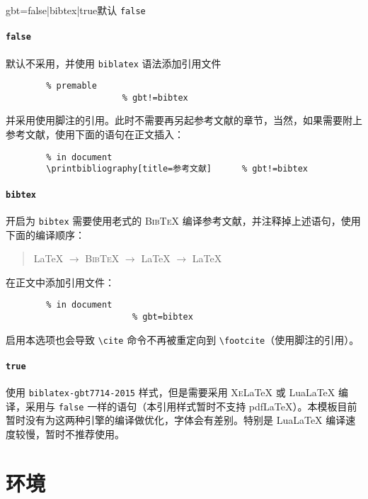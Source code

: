 \documentclass[a4paper,12pt]{article}
\begin{document}
\begin{CJK}{UTF8}{song}
\begin{docKey*}[SJTUBeamermin]{gbt}{=false|bibtex|true}{默认 \texttt{false}}
    \paragraph{\texttt{false}} 默认不采用，并使用 \verb"biblatex" 语法添加引用文件
    \begin{verbatim}
        % premable
                       % gbt!=bibtex
    \end{verbatim}
    并采用使用脚注的引用。此时不需要再另起参考文献的章节，当然，如果需要附上参考文献，使用下面的语句在正文插入：
    \begin{verbatim}
        % in document
        \printbibliography[title=参考文献]      % gbt!=bibtex
    \end{verbatim}
    \paragraph{\texttt{bibtex}} 开启为 \verb"bibtex" 需要使用老式的 \textsc{Bib\TeX{}} 编译参考文献，并注释掉上述语句，使用下面的编译顺序：
    \begin{quotation}
        \LaTeX{} $\rightarrow$ \textsc{Bib\TeX{}} $\rightarrow$ \LaTeX{} $\rightarrow$ \LaTeX{}
    \end{quotation}
    在正文中添加引用文件：
    \begin{verbatim}
        % in document
                         % gbt=bibtex
    \end{verbatim}
    启用本选项也会导致 \verb"\cite" 命令不再被重定向到 \verb"\footcite"（使用脚注的引用）。
    \paragraph{\texttt{true}} 使用 \verb"biblatex-gbt7714-2015" 样式，但是需要采用 \textsc{Xe}\LaTeX{} 或 Lua\LaTeX{} 编译，采用与 \verb"false" 一样的语句（本引用样式暂时不支持 pdf\LaTeX{}）。本模板目前暂时没有为这两种引擎的编译做优化，字体会有差别。特别是 Lua\LaTeX{} 编译速度较慢，暂时不推荐使用。 
\end{docKey*}

\section{环境}


\end{CJK}
\end{document}
